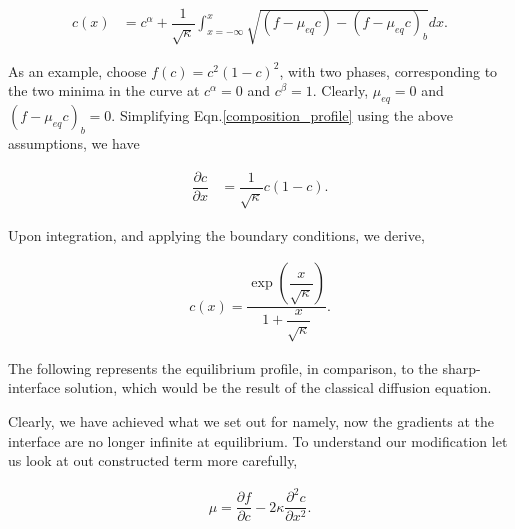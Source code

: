 \documentclass[english]{iambook}
\begin{document}
\begin{align}
 c\left(x\right) &= c^{\alpha} + \dfrac{1}{\sqrt{\kappa}}\int_{x=-\infty}^{x}\sqrt{\left(f - \mu_{eq}c\right) - \left(f - \mu_{eq}c\right)_b}dx.
\end{align}

As an example, choose $f\left(c\right) = c^{2}\left(1-c\right)^{2}$, 
with two phases, corresponding to the two minima in the curve at
$c^{\alpha}= 0$ and $c^{\beta}=1$. Clearly, $\mu_{eq}=0$ and 
$\left(f-\mu_{eq}c\right)_b=0$. Simplifying Eqn.\ref{composition_profile}
using the above assumptions, we have 

\begin{align}
 \dfrac{\partial c}{\partial x} &= \dfrac{1}{\sqrt{\kappa}}c\left(1-c\right).
\end{align}

Upon integration, and applying the boundary conditions, we derive,

\begin{align}
 c\left(x\right) = \dfrac{\exp\left(\dfrac{x}{\sqrt{\kappa}}\right)}{1 + \dfrac{x}{\sqrt{\kappa}}}.
\end{align}

The following represents the equilibrium profile, in comparison, 
to the sharp-interface solution, which would be the result of
the classical diffusion equation.

\begin{center}
  \end{center}

Clearly, we have achieved what we set out for namely,
now the gradients at the interface are no longer infinite
at equilibrium. To understand our modification let us look
at out constructed term more carefully, 

\begin{align}
 \mu = \dfrac{\partial f}{\partial c} - 2\kappa\dfrac{\partial ^{2}c}{\partial x^{2}}.
\end{align}
\end{document}
